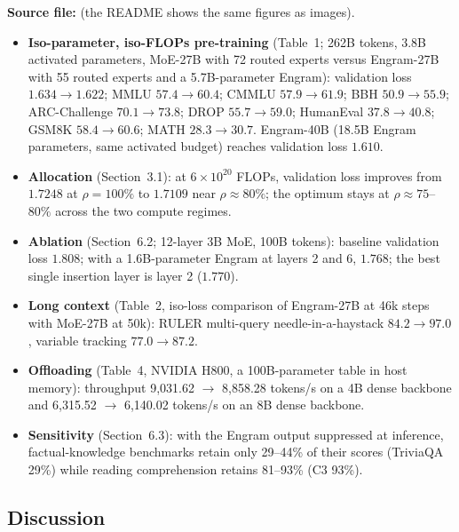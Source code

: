 \begin{results}
\textbf{Source file:}  (the README shows the
same figures as images).
\begin{itemize}
  \item \textbf{Iso-parameter, iso-FLOPs pre-training} (Table~1; 262B tokens, 3.8B activated
        parameters, MoE-27B with 72 routed experts versus Engram-27B with 55 routed experts and a
        5.7B-parameter Engram): validation loss $1.634 \to 1.622$; MMLU $57.4 \to 60.4$; CMMLU
        $57.9 \to 61.9$; BBH $50.9 \to 55.9$; ARC-Challenge $70.1 \to 73.8$; DROP $55.7 \to 59.0$;
        HumanEval $37.8 \to 40.8$; GSM8K $58.4 \to 60.6$; MATH $28.3 \to 30.7$. Engram-40B (18.5B
        Engram parameters, same activated budget) reaches validation loss $1.610$.
  \item \textbf{Allocation} (Section~3.1): at $6\times10^{20}$ FLOPs, validation loss improves from
        $1.7248$ at $\rho = 100\%$ to $1.7109$ near $\rho \approx 80\%$; the optimum stays at
        $\rho \approx 75$--$80\%$ across the two compute regimes.
  \item \textbf{Ablation} (Section~6.2; 12-layer 3B MoE, 100B tokens): baseline validation loss
        $1.808$; with a 1.6B-parameter Engram at layers 2 and 6, $1.768$; the best single
        insertion layer is layer 2 ($1.770$).
  \item \textbf{Long context} (Table~2, iso-loss comparison of Engram-27B at 46k steps with MoE-27B
        at 50k): RULER multi-query needle-in-a-haystack $84.2 \to 97.0$, variable tracking
        $77.0 \to 87.2$.
  \item \textbf{Offloading} (Table~4, NVIDIA H800, a 100B-parameter table in host memory):
        throughput 9{,}031.62 $\to$ 8{,}858.28 tokens/s on a 4B dense backbone and 6{,}315.52 $\to$
        6{,}140.02 tokens/s on an 8B dense backbone.
  \item \textbf{Sensitivity} (Section~6.3): with the Engram output suppressed at inference,
        factual-knowledge benchmarks retain only 29--44\% of their scores (TriviaQA 29\%) while
        reading comprehension retains 81--93\% (C3 93\%).
\end{itemize}
\end{results}

\subsection{Discussion}

